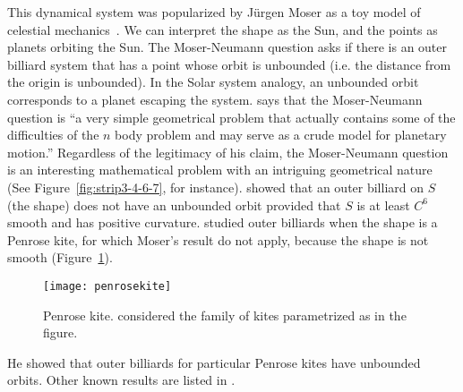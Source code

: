 \documentclass[10pt,twoside]{book}
\begin{document}
This dynamical system was popularized by Jürgen Moser as a toy model of celestial mechanics~\citep{moser,moserbook}.
We can interpret the shape as the Sun, and the points as planets orbiting the Sun.
The Moser-Neumann question asks if there is an outer billiard system that has a point whose orbit is unbounded (i.e. the distance from the origin is unbounded).
In the Solar system analogy, an unbounded orbit corresponds to a planet escaping the system.
\citet{moser} says that the Moser-Neumann question is
``a very simple geometrical problem that actually contains some of the difficulties of the $n$ body problem and may serve as a crude model for planetary motion.''
Regardless of the legitimacy of his claim, the Moser-Neumann question is an interesting mathematical problem with an intriguing geometrical nature (See Figure~\ref{fig:strip3-4-6-7}, for instance).
\citet{moserbook} showed that an outer billiard on $S$ (the shape) does not have an unbounded orbit provided that $S$ is at least $C^6$ smooth and has positive curvature. 
\citet{schwartz} studied outer billiards when the shape is a Penrose kite, for which Moser's result do not apply, because the shape is not smooth (Figure~\ref{fig:penrosekite}).
\begin{figure}[ht]
  \begin{center}
    \texttt{[image: penrosekite]}
    \caption{Penrose kite. \citet{schwartz} considered the family of kites parametrized as in the figure.}
    \label{fig:penrosekite}
  \end{center}
\end{figure}
He showed that outer billiards for particular Penrose kites have unbounded orbits.
Other known results are listed in \citet[p. 2]{schwartz}.
\end{document}
